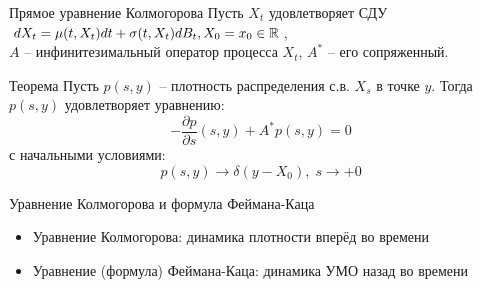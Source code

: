 \documentclass[aspectratio=169]{beamer}
\begin{document}
\begin{frame}{Прямое уравнение Колмогорова}
    Пусть $X_t$ удовлетворяет СДУ $dX_t = \mu(t, X_t) dt + \sigma(t, X_t) dB_t, X_0 = x_0 \in \mathbb{R}$, 
    \\ $A$ -- инфинитезимальный оператор процесса $X_t$, $A^*$ -- его сопряженный.
    \begin{block}{Теорема}
        Пусть $p(s, y)$ -- плотность распределения с.в. $X_s$ в точке $y$. Тогда $p(s, y)$ удовлетворяет уравнению:
        $$
            -\dfrac{\partial p}{\partial s}(s, y) + A^*p(s, y) = 0
        $$с начальными условиями:
        $$
            p(s, y) \to \delta(y - X_0), \; s \to +0
        $$
    \end{block}
\end{frame}

\begin{frame}{Уравнение Колмогорова и формула Феймана-Каца}
    \begin{itemize}
        \item Уравнение Колмогорова: динамика плотности вперёд во времени
        \item Уравнение (формула) Феймана-Каца: динамика УМО назад во времени 
    \end{itemize}
\end{frame}
\end{document}
